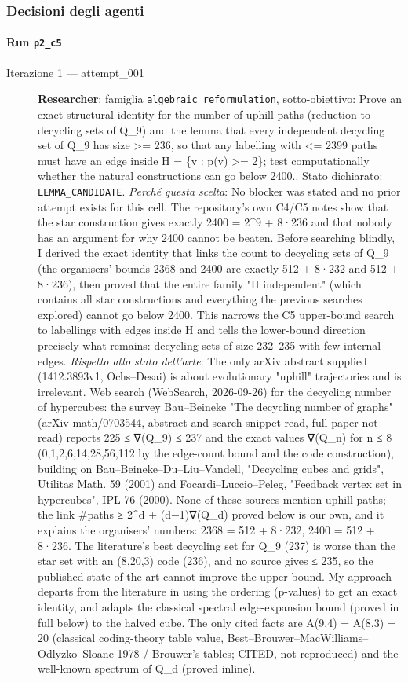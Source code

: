 \documentclass[11pt,a4paper]{article}
\begin{document}
\subsubsection{Decisioni degli agenti}
\paragraph{Run \texttt{p2\_c5}}
\begin{description}
\item[Iterazione 1 — attempt\_001]
\textbf{Researcher}: famiglia \texttt{algebraic\_reformulation}, sotto-obiettivo: Prove an exact structural identity for the number of uphill paths (reduction to decycling sets of Q\_9) and the lemma that every independent decycling set of Q\_9 has size \textgreater{}= 236, so that any labelling with \textless{}= 2399 paths must have an edge inside H = \{v : p(v) \textgreater{}= 2\}; test computationally whether the natural constructions can go below 2400.. Stato dichiarato: \texttt{LEMMA\_CANDIDATE}.
\emph{Perché questa scelta}: No blocker was stated and no prior attempt exists for this cell. The repository's own C4/C5 notes show that the star construction gives exactly 2400 = 2\textasciicircum{}9 + 8·236 and that nobody has an argument for why 2400 cannot be beaten. Before searching blindly, I derived the exact identity that links the count to decycling sets of Q\_9 (the organisers' bounds 2368 and 2400 are exactly 512 + 8·232 and 512 + 8·236), then proved that the entire family "H independent" (which contains all star constructions and everything the previous searches explored) cannot go below 2400. This narrows the C5 upper-bound search to labellings with edges inside H and tells the lower-bound direction precisely what remains: decycling sets of size 232–235 with few internal edges.
\emph{Rispetto allo stato dell'arte}: The only arXiv abstract supplied (1412.3893v1, Ochs–Desai) is about evolutionary "uphill" trajectories and is irrelevant. Web search (WebSearch, 2026-09-26) for the decycling number of hypercubes: the survey Bau–Beineke "The decycling number of graphs" (arXiv math/0703544, abstract and search snippet read, full paper not read) reports 225 ≤ ∇(Q\_9) ≤ 237 and the exact values ∇(Q\_n) for n ≤ 8 (0,1,2,6,14,28,56,112 by the edge-count bound and the code construction), building on Bau–Beineke–Du–Liu–Vandell, "Decycling cubes and grids", Utilitas Math. 59 (2001) and Focardi–Luccio–Peleg, "Feedback vertex set in hypercubes", IPL 76 (2000). None of these sources mention uphill paths; the link \#paths ≥ 2\textasciicircum{}d + (d−1)∇(Q\_d) proved below is our own, and it explains the organisers' numbers: 2368 = 512 + 8·232, 2400 = 512 + 8·236. The literature's best decycling set for Q\_9 (237) is worse than the star set with an (8,20,3) code (236), and no source gives ≤ 235, so the published state of the art cannot improve the upper bound. My approach departs from the literature in using the ordering (p-values) to get an exact identity, and adapts the classical spectral edge-expansion bound (proved in full below) to the halved cube. The only cited facts are A(9,4) = A(8,3) = 20 (classical coding-theory table value, Best–Brouwer–MacWilliams–Odlyzko–Sloane 1978 / Brouwer's tables; CITED, not reproduced) and the well-known spectrum of Q\_d (proved inline).

\end{description}
\end{document}
